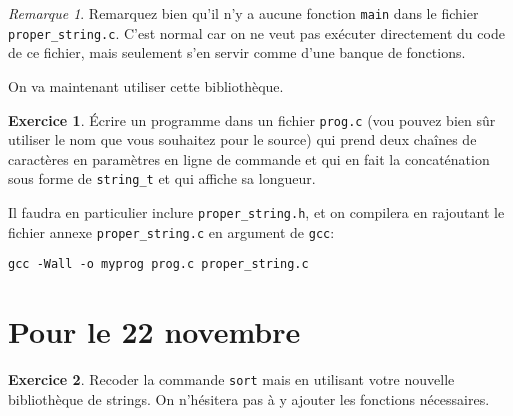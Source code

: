 \documentclass[french,a4paper]{article}
\theoremstyle{definition}
\newtheorem{exercise}{Exercice}
\theoremstyle{remark}
\newtheorem*{remark}{Remarque}
\newcommand{\shell}[1]{\lstinline[style={},style=sh]|#1|}
\newcommand{\inlinec}[1]{\lstinline[style=C]°#1°}
\begin{document}
\begin{remark}
  Remarquez bien qu'il n'y a aucune fonction \inlinec{main} dans le
  fichier \shell{proper_string.c}. C'est normal car on ne veut pas
  exécuter directement du code de ce fichier, mais seulement s'en
  servir comme d'une banque de fonctions.
\end{remark}

On va maintenant utiliser cette bibliothèque.
\begin{exercise}
  \'Ecrire un programme dans un fichier \shell{prog.c} (vou pouvez
  bien sûr utiliser le nom que vous souhaitez pour le source) qui
  prend deux chaînes de caractères en paramètres en ligne de commande
  et qui en fait la concaténation sous forme de \inlinec{string_t} et
  qui affiche sa longueur.

  Il faudra en particulier inclure \shell{proper_string.h}, et on
  compilera en rajoutant le fichier annexe \shell{proper_string.c}
  en argument de \shell{gcc}:
  \begin{lstlisting}[style={},style=sh]
gcc -Wall -o myprog prog.c proper_string.c 
  \end{lstlisting}
\end{exercise}


\section{Pour le 22 novembre}
\label{sec:homeworks}

\begin{exercise}
  Recoder la commande {\tt sort} mais en utilisant votre nouvelle
  bibliothèque de strings. On n'hésitera pas à y ajouter les fonctions
  nécessaires.
\end{exercise}
\end{document}
